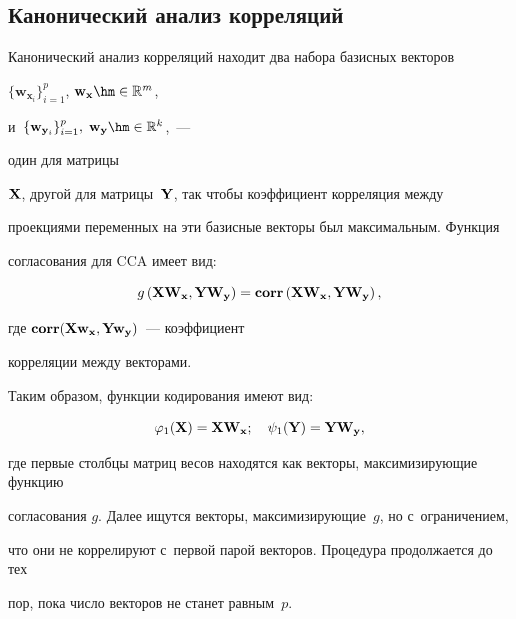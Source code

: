 \subsection{Канонический анализ корреляций}



Канонический анализ корреляций находит два набора базисных векторов 

$\{\mathbf{w}_{\mathbf{x}_i}\}_{i=1}^{p}$, $\mathbf{w}_{\mathbf{x}}\hm \in \mathbb{R}^{m}$, 

и~$\{\mathbf{w}_{\mathbf{y}_i}\}_{i=1}^{p}, \; \mathbf{w}_{\mathbf{y}}\hm \in \mathbb{R}^{k}$,~---

 один для матрицы 

$\mathbf{X}$, другой для матрицы~$\mathbf{Y}$, так чтобы коэффициент корреляция между 

проекциями переменных на эти базисные векторы был максимальным. Функция 

согласования для CCA имеет вид:

\begin{equation*}

    g\left(\bX \bW_{\mathbf{x}}, \bY \bW_{\mathbf{y}}\right) = \textbf{corr}\left(\bX \bW_{\mathbf{x}}, \bY 

\bW_{\mathbf{y}}\right),

\end{equation*}

где $\textbf{corr}(\mathbf{X} \mathbf{w}_{\mathbf{x}}, \mathbf{Y} \mathbf{w}_{\mathbf{y}})$~--- коэффициент 

корреляции между векторами.



Таким образом, функции кодирования имеют вид:

\begin{equation*}

    \varphi_1(\bX) = \bX \bW_{\mathbf{x}} ; \quad

    \psi_1(\bY) = \bY \bW_{\mathbf{y}},

\end{equation*}

где первые столбцы матриц весов находятся как векторы, максимизирующие функцию 

согласования $g$. Далее ищутся векторы, максимизирующие~$g$, но с~ограничением, 

что они не коррелируют с~первой парой векторов. Процедура продолжается до тех 

пор, пока число векторов не станет равным~$p$.



